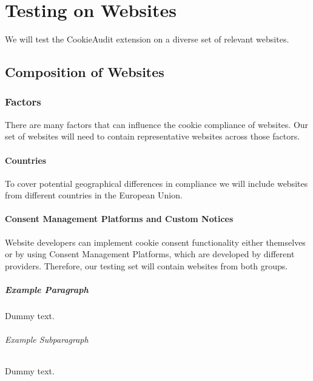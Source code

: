 \chapter{Testing on Websites}

We will test the CookieAudit extension on a diverse set of relevant websites. 

\section{Composition of Websites}

\subsection{Factors}

There are many factors that can influence the cookie compliance of websites.
Our set of websites will need to contain representative websites across those factors.

\subsubsection{Countries}

To cover potential geographical differences in compliance we will include websites from different countries in the European Union.

\subsubsection{Consent Management Platforms and Custom Notices}

Website developers can implement cookie consent functionality either themselves or by using Consent Management Platforms, which are developed by different providers.
Therefore, our testing set will contain websites from both groups.

\paragraph{Example Paragraph}

Dummy text.

\subparagraph{Example Subparagraph}

Dummy text.
